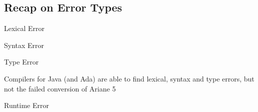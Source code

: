 \subsection{Recap on Error Types}
\begin{frame}{\insertsubsection}
	\begin{fancycolumns}[columns=3,widths={25,35}]
		\begin{exampletight}{Lexical Error}
			\centering\makebox{\usebox{\edgelexicalerror}}
		\end{exampletight}
	\nextcolumn
		\begin{exampletight}{Syntax Error}
			\centering\makebox{\usebox{\edgesyntaxerror}}
		\end{exampletight}
	\nextcolumn
		\begin{exampletight}{Type Error}
			\centering\makebox{\usebox{\edgetypeerror}}
		\end{exampletight}
	\end{fancycolumns}
	\begin{note}{Compilers for Java (and Ada)}
		are able to find lexical, syntax and type errors, but not the failed conversion of Ariane 5
	\end{note}
\end{frame}

\begin{frame}{\insertsubsection}
	\begin{fancycolumns}
		\begin{exampletight}{Runtime Error}
			\centering\makebox{\usebox{\edgeruntimeerror}}
		\end{exampletight}
		\nextcolumn
	\end{fancycolumns}
\end{frame}

